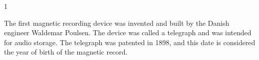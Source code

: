 \documentclass[a4paper,14pt]{extreport}
\begin{document}
  \noindent{\color{blue} \rule{\linewidth}{0.7mm}}
  \begin{center}1\end{center}
  \noindent{\color{blue} \rule{\linewidth}{0.7mm}}

The first magnetic recording device was invented and built by the Danish engineer Waldemar Poulsen. The device was called a telegraph and was intended for audio storage. The telegraph was patented in 1898, and this date is considered the year of birth of the magnetic record. \par
\end{document}
